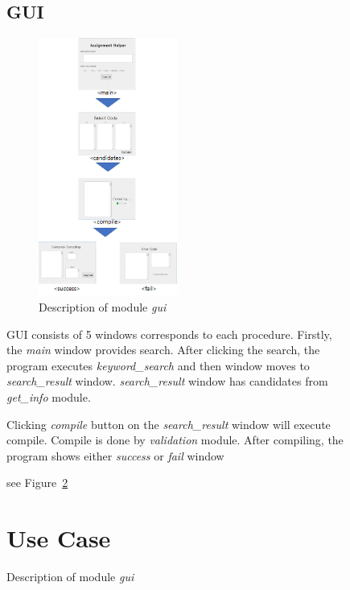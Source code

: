 \documentclass[conference]{IEEEtran}
\begin{document}
\begin{itemize}
\begin{itemize}
\begin{itemize}
\begin{itemize}
\begin{figure}[h]
\begin{enumerate}
\begin{itemize}
\begin{enumerate}
\subsection{GUI} %
\label{sub:gui}
\begin{figure}[ht]
\centering
\includegraphics[width=0.5\textwidth]{./figures/gui_overall.png}
\caption{Description of module \textit{gui}}
\label{gui}
\end{figure}
GUI consists of 5 windows corresponds to each procedure.
Firstly, the \textit{main} window provides search.
After clicking the search, the program executes \textit{keyword\_search} and then window moves to \textit{search\_result} window.
\textit{search\_result} window has candidates from \textit{get\_info} module.

Clicking \textit{compile} button on the  \textit{search\_result} window will execute compile.
Compile is done by \textit{validation} module. After compiling, the program shows either \textit{success} or \textit{fail} window


see Figure~\ref{gui}




\section{Use Case} %
\label{sec:use_case}


\end{enumerate}
\end{itemize}
\end{enumerate}
\end{figure}
\end{itemize}
\end{itemize}
\end{itemize}
\end{itemize}
\end{document}
